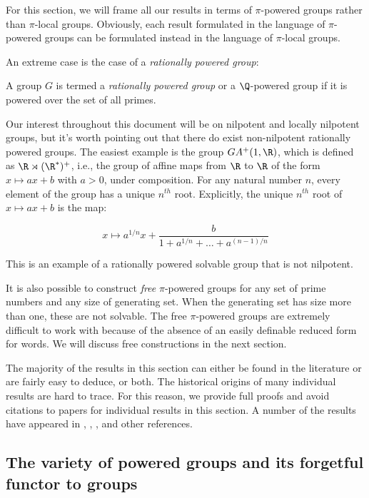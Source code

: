 \documentclass{ucetd}
\begin{document}
For this section, we will frame all our results in terms of
$\pi$-powered groups rather than $\pi$-local groups. Obviously, each
result formulated in the language of $\pi$-powered groups can be
formulated instead in the language of $\pi$-local groups.

An extreme case is the case of a {\em rationally powered group}:

\begin{definer}
  A group $G$ is termed a {\em rationally powered group} or a
  $\Q$-powered group if it is powered over the set of all primes.
\end{definer}

Our interest throughout this document will be on nilpotent and locally
nilpotent groups, but it's worth pointing out that there do exist
non-nilpotent rationally powered groups. The easiest example is the
group $GA^+(1,\R)$, which is defined as $\R \rtimes (\R^*)^+$, i.e.,
the group of affine maps from $\R$ to $\R$ of the form $x \mapsto ax +
b$ with $a > 0$, under composition. For any natural number $n$, every
element of the group has a unique $n^{th}$ root. Explicitly, the unique
$n^{th}$ root of $x \mapsto ax + b$ is the map:

$$x \mapsto a^{1/n}x + \frac{b}{1 + a^{1/n} + \dots + a^{(n-1)/n}}$$

This is an example of a rationally powered solvable group that is not
nilpotent.

It is also possible to construct {\em free} $\pi$-powered groups for
any set of prime numbers and any size of generating set. When the
generating set has size more than one, these are not solvable. The
free $\pi$-powered groups are extremely difficult to work with because
of the absence of an easily definable reduced form for words. We will
discuss free constructions in the next section.

The majority of the results in this section can either be found in the
literature or are fairly easy to deduce, or both. The historical
origins of many individual results are hard to trace. For this reason,
we provide full proofs and avoid citations to papers for individual
results in this section. A number of the results have appeared in
\cite{Baumslagunique}, \cite{ConciseII}, \cite{Khukhro}, and other
references.

\subsection{The variety of powered groups and its forgetful functor to groups}\label{sec:variety-powered-forgetful-functor}
\end{document}
